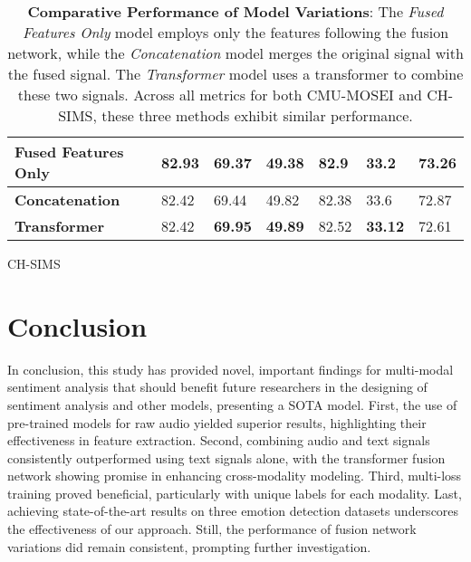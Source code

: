 \documentclass[11pt]{article}
\begin{document}
\begin{table*}
\begin{subtable}{\textwidth}
\begin{tabular}{lllllll}
\textbf{Fused Features Only} & \textbf{82.93} & 69.37 & 49.38 & \textbf{82.9} & 33.2 & \textbf{73.26} \\ \hline
\textbf{Concatenation} & 82.42 & 69.44 & 49.82 & 82.38 & 33.6 & 72.87 \\ \hline
\textbf{Transformer} & 82.42 & \textbf{69.95} & \textbf{49.89} & 82.52 & \textbf{33.12} & 72.61 \\ \hline
\end{tabular}
\caption{CH-SIMS}
\label{tab:CH-SIMS5}
\end{subtable}
\caption{\textbf{Comparative Performance of Model Variations}: The {\it Fused Features Only} model employs only the features following the fusion network, while the {\it Concatenation} model merges the original signal with the fused signal. The {\it Transformer} model uses a transformer to combine these two signals. Across all metrics for both CMU-MOSEI and CH-SIMS, these three methods exhibit similar performance.}
\label{tab:Performance6}
\end{table*}
\section{Conclusion}
In conclusion, this study has provided novel, important findings for multi-modal sentiment analysis that should benefit future researchers in the designing of sentiment analysis and other models, presenting a SOTA model. First, the use of pre-trained models for raw audio yielded superior results, highlighting their effectiveness in feature extraction. Second, combining audio and text signals consistently outperformed using text signals alone, with the transformer fusion network showing promise in enhancing cross-modality modeling. Third, multi-loss training proved beneficial, particularly with unique labels for each modality. Last, achieving state-of-the-art results on three emotion detection datasets underscores the effectiveness of our approach. Still, the performance of fusion network variations did remain consistent, prompting further investigation. 

\end{document}
